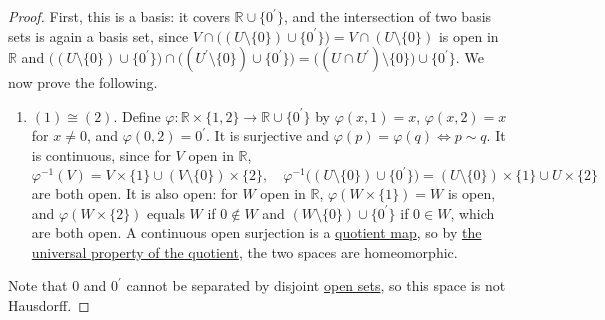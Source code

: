 	\begin{proof}
	  First, this is a basis: it covers $\mathbb{R} \cup \{0^\prime\}$, and the intersection of two basis sets is again a basis set, since $V \cap \big((U \setminus \{0\}) \cup \{0^\prime\}\big) = V \cap (U \setminus \{0\})$ is open in $\mathbb{R}$ and $\big((U \setminus \{0\}) \cup \{0^\prime\}\big) \cap \big((U^\prime \setminus \{0\}) \cup \{0^\prime\}\big) = \big((U \cap U^\prime) \setminus \{0\}\big) \cup \{0^\prime\}$. We now prove the following. 
		\begin{enumerate}
		  \item $(1) \cong (2)$. Define $\varphi: \mathbb{R} \times \{1, 2\} \rightarrow \mathbb{R} \cup \{0^\prime\}$ by $\varphi(x, 1) = x$, $\varphi(x, 2) = x$ for $x \neq 0$, and $\varphi(0, 2) = 0^\prime$. It is surjective and $\varphi(p) = \varphi(q) \iff p \sim q$. It is continuous, since for $V$ open in $\mathbb{R}$, 
				\begin{equation}
					\varphi^{-1}(V) = V \times \{1\} \cup (V \setminus \{0\}) \times \{2\}, \quad \varphi^{-1}\big((U \setminus \{0\}) \cup \{0^\prime\}\big) = (U \setminus \{0\}) \times \{1\} \cup U \times \{2\}
				\end{equation}
				are both open. It is also open: for $W$ open in $\mathbb{R}$, $\varphi(W \times \{1\}) = W$ is open, and $\varphi(W \times \{2\})$ equals $W$ if $0 \notin W$ and $(W \setminus \{0\}) \cup \{0^\prime\}$ if $0 \in W$, which are both open. A continuous open surjection is a \hyperref[def:quotient-map]{quotient map}, so by \hyperref[thm:quotient_homeomorphism]{the universal property of the quotient}, the two spaces are homeomorphic. 
		\end{enumerate}
		Note that $0$ and $0^\prime$ cannot be separated by disjoint \hyperref[def:open-set]{open sets}, so this space is not Hausdorff. 
	\end{proof}

